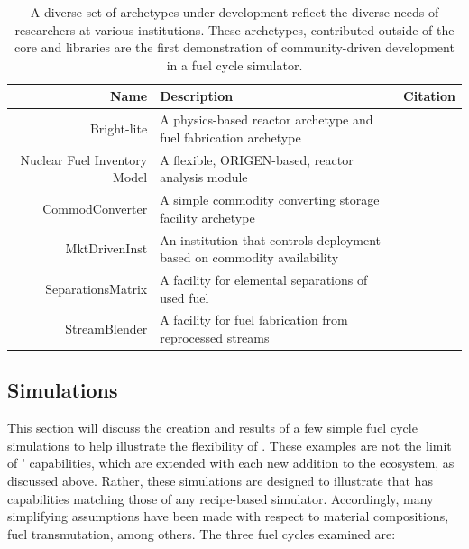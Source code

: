 \begin{table}[h]
\centering
\begin{tabularx}{\textwidth}{|r|X|r|}
\hline
\textbf{Name} & \textbf{Description} & \textbf{Citation} \\
\hline
Bright-lite & A physics-based reactor archetype and fuel fabrication archetype & \cite{flanagan_bright-lite_2014} \\
Nuclear Fuel Inventory Model & A flexible, ORIGEN-based, reactor analysis module & \cite{skutnik_development_2015} \\
CommodConverter & A simple commodity converting storage facility archetype  & \cite{huff_commodconverter_2014} \\
MktDrivenInst & An institution that controls deployment based on commodity availability & \cite{huff_mktdriveninst_2014} \\
SeparationsMatrix & A facility for elemental separations of used fuel & \cite{huff_streamblender_2014} \\
StreamBlender & A facility for fuel fabrication from reprocessed streams & \cite{huff_streamblender_2014} \\
\hline
\end{tabularx}
\caption{A diverse set of archetypes under development reflect the diverse
needs of researchers at various institutions. These archetypes, contributed
outside of the \Cyclus core and \Cycamore libraries are the first demonstration
of community-driven development in a fuel cycle simulator.}
\label{tab:archetypes}
\end{table}

\subsection{Simulations}
\label{ref:simulations}


This section will discuss the creation and results of a few simple fuel cycle
simulations to help illustrate the flexibility of \Cyclus. These examples are
not the limit of \Cyclus' capabilities, which are extended with each new
addition to the ecosystem, as discussed above.  Rather, these simulations are
designed to illustrate that \Cyclus has capabilities matching those of any
recipe-based simulator.  Accordingly, many simplifying assumptions have been
made with respect to material compositions, fuel transmutation, among others.
The three fuel cycles examined are:

